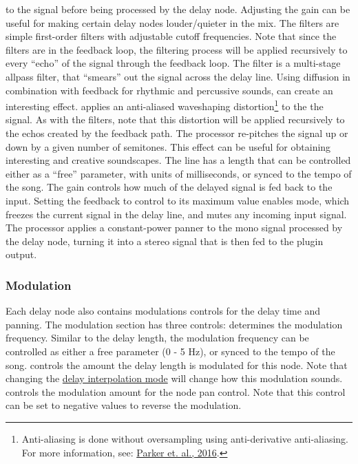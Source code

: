 \documentclass[landscape,twocolumn,a5paper]{manual}
\begin{document}
to the signal before being processed by the delay
node. Adjusting the gain can be useful for making
certain delay nodes louder/quieter in the mix.
\newpar
The  filters are simple
first-order filters with adjustable cutoff frequencies.
Note that since the filters are in the feedback loop,
the filtering process will be applied recursively to every
``echo'' of the signal through the feedback loop.
\newpar
The  filter is a multi-stage allpass
filter, that ``smears'' out the signal across the delay line.
Using diffusion in combination with feedback for rhythmic
and percussive sounds, can create an interesting effect.
\newpar
{} applies an anti-aliased waveshaping
distortion\footnote{Anti-aliasing is done without oversampling using anti-derivative anti-aliasing. For more information, see: \href{http://dafx16.vutbr.cz/dafxpapers/20-DAFx-16_paper_41-PN.pdf}{Parker et. al., 2016}.}
to the the signal. As with the filters, note that this
distortion will be applied recursively to the echos created
by the feedback path.
\newpar
The  processor re-pitches the signal up
or down by a given number of semitones. This effect can be
useful for obtaining interesting and creative soundscapes.
\newline
The  line has a length that can be
controlled either as a ``free'' parameter, with units
of milliseconds, or synced to the tempo of the song.
\newpar
The  gain controls how much of the
delayed signal is fed back to the input.
Setting the feedback to control to its maximum value
enables  mode, which freezes the
current signal in the delay line, and mutes any incoming
input signal.
\newpar
The  processor applies a constant-power
panner to the mono signal processed by the delay node,
turning it into a stereo signal that is then fed to the
plugin output.

\subsubsection{Modulation}
Each delay node also contains modulations controls for the
delay time and panning. The modulation section has three
controls:
\newpar
{} determines the modulation frequency.
Similar to the delay length, the modulation frequency can
be controlled as either a free parameter (0 - 5 Hz), or
synced to the tempo of the song.
\newpar
{} controls the amount the delay length
is modulated for this node. Note that changing the
\hyperlink{goto:interp-mode}{delay interpolation mode}
will change how this modulation sounds.
\newpar
{} controls the modulation amount for
the node pan control. Note that this control can be
set to negative values to reverse the modulation.
\end{document}
